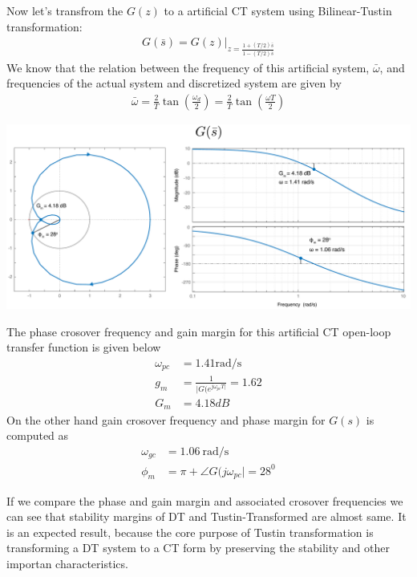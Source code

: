 \documentclass[twoside]{article}
\begin{document}
Now let's transfrom the $G(z)$ to a artificial CT system using 
Bilinear-Tustin transformation:
%
%
\begin{align*}
  G(\bar{s}) = G(z) |_{z = \frac{1 + (T/2) \bar{s}}{1 - (T/2) \bar{s}}}
\end{align*}
%
We know that the relation between the frequency of this 
artificial system, $\bar{\omega}$, and frequencies of the actual system
and discretized system are given by
%
\begin{align*}
\bar{\omega} = \frac{2}{T} \tan (\frac{\omega_d}{2}) = \frac{2}{T}
  \tan (\frac{\omega T}{2}) 
\end{align*}
%
%
\begin{center}
\begin{minipage}[h]{\linewidth}
    \begin{center}
      \includegraphics[width=\textwidth]{Gt}
    \end{center}
\end{minipage}
\end{center}
%

The phase crosover frequency and gain margin for this artificial CT open-loop
transfer function is given below
%
\begin{align*}
\omega_{pc} &= 1.41 \mathrm{rad/s} 
\\
g_m &= \frac{1}{| G(e^{j \omega_{pc} T|}} = 1.62
\\
G_m &= 4.18 dB
\end{align*}
%
On the other hand gain crosover frequency and phase margin 
for $G(s)$ is computed as
%
\begin{align*}
\omega_{gc} &= 1.06 \ \mathrm{rad/s} 
\\
\phi_m &= \pi + \angle G(j \omega_{pc}| = 28^0
\end{align*}

If we compare the phase and gain margin and associated
crosover frequencies we can see that stability margins of
DT and Tustin-Transformed are almost same. It is an expected
result, because the core purpose of Tustin transformation
is transforming a DT system to a CT form by preserving the
stability and other importan characteristics.
\end{document}
